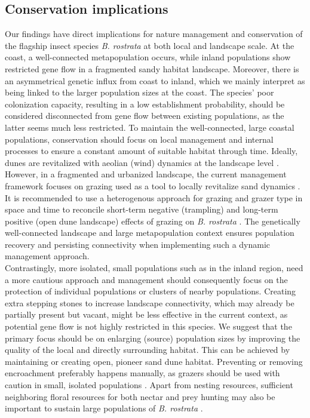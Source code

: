 \documentclass[10pt, twoside]{book} %
\begin{document}
	\subsection{Conservation implications}
	Our findings have direct implications for nature management and conservation of the flagship insect species \textit{B. rostrata} at both local and landscape scale. At the coast, a well-connected metapopulation occurs, while inland populations show restricted gene flow in a fragmented sandy habitat landscape. Moreover, there is an asymmetrical genetic influx from coast to inland, which we mainly interpret as being linked to the larger population sizes at the coast. The species' poor colonization capacity, resulting in a low establishment probability, should be considered disconnected from gene flow between existing populations, as the latter seems much less restricted. To maintain the well-connected, large coastal populations, conservation should focus on local management and internal processes to ensure a constant amount of suitable habitat through time. Ideally, dunes are revitalized with aeolian (wind) dynamics at the landscape level \citep{provoost2011}. However, in a fragmented and urbanized landscape, the current management framework focuses on grazing used as a tool to locally revitalize sand dynamics \citep{provoost2004}. It is recommended to use a heterogenous approach for grazing and grazer type in space and time to reconcile short-term negative (trampling) and long-term positive (open dune landscape) effects of grazing on \textit{B. rostrata} \citep[chapter \ref{chapter3}]{bonte2005, batsleer2022a}. The genetically well-connected landscape and large metapopulation context ensures population recovery and persisting connectivity when implementing such a dynamic management approach.\\
	
	Contrastingly, more isolated, small populations such as in the inland region, need a more cautious approach and management should consequently focus on the protection of individual populations or clusters of nearby populations. Creating extra stepping stones to increase landscape connectivity, which may already be partially present but vacant, might be less effective in the current context, as potential gene flow is not highly restricted in this species. We suggest that the primary focus should be on enlarging (source) population sizes by improving the quality of the local and directly surrounding habitat. This can be achieved by maintaining or creating open, pioneer sand dune habitat. Preventing or removing encroachment preferably happens manually, as grazers should be used with caution in small, isolated populations \citep[chapter \ref{chapter3}]{batsleer2022a}. Apart from nesting resources, sufficient neighboring floral resources for both nectar and prey hunting may also be important to sustain large populations  of \textit{B. rostrata} \citep{kimoto2012, buckles2019}.
	
\end{document}

